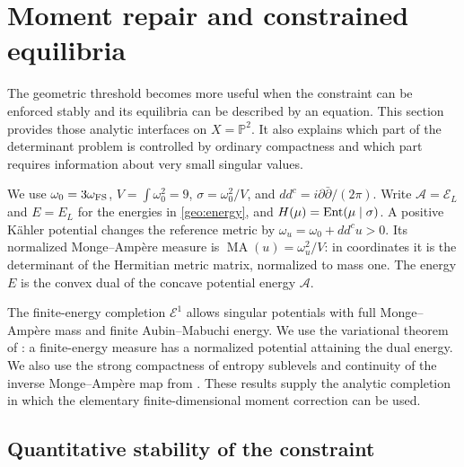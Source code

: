 \section{Moment repair and constrained equilibria}
\label{sec:equilibria}

The geometric threshold becomes more useful when the constraint can be
enforced stably and its equilibria can be described by an equation.
This section provides those analytic interfaces on $X=\mathbb P^2$.
It also explains which part of the determinant problem is controlled by
ordinary compactness and which part requires information about very small
singular values.

We use $\omega_0=3\omega_{\rm FS}$, $V=\int\omega_0^2=9$,
$\sigma=\omega_0^2/V$, and $dd^c=i\partial\bar\partial/(2\pi)$.
Write $\mathcal A=\mathcal E_L$ and $E=E_L$ for the energies in
\eqref{geo:energy}, and $H(\mu)=\operatorname{Ent}(\mu\mid\sigma)$. A positive
K\"ahler potential changes the reference metric by
$\omega_u=\omega_0+dd^cu>0$. Its normalized Monge--Amp\`ere measure is
$\operatorname{MA}(u)=\omega_u^2/V$: in coordinates it is the determinant
of the Hermitian metric matrix, normalized to mass one. The energy $E$ is
the convex dual of the concave potential energy $\mathcal A$.

The finite-energy completion $\mathcal E^1$ allows singular potentials
with full Monge--Amp\`ere mass and finite Aubin--Mabuchi energy. We use the
variational theorem of \citet{BBGZ2013}: a finite-energy measure has a
normalized potential attaining the dual energy. We also use the strong
compactness of entropy sublevels and continuity of the inverse
Monge--Amp\`ere map from \citet[Theorem 2.17 and Corollary 2.19]{BBEGZ2019}.
These results supply the analytic completion in which the elementary
finite-dimensional moment correction can be used.

\subsection{Quantitative stability of the constraint}

